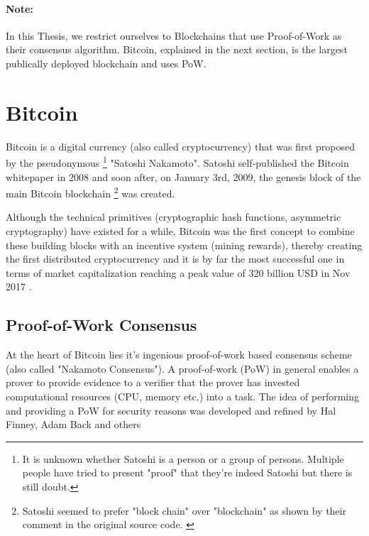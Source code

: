 \paragraph{Note: }
In this Thesis, we restrict ourselves to Blockchains that use Proof-of-Work as their consensus algorithm. 
Bitcoin, explained in the next section, is the largest publically deployed blockchain and uses PoW.

\section{Bitcoin} \label{intro-bitcoin}

Bitcoin is a digital currency (also called cryptocurrency) that was first proposed by the pseudonymous \footnote{It is unknown whether Satoshi is a person or a group of persons. Multiple people have tried to present "proof" that they're indeed Satoshi but there is still doubt.} "Satoshi Nakamoto". 
Satoshi self-published the Bitcoin whitepaper in 2008 \cite{bitcoinOriginal} and soon after, on January 3rd, 2009, the genesis block of the main Bitcoin blockchain \footnote{Satoshi seemed to prefer "block chain" over "blockchain" as shown by their comment in the original source code. \cite{satoshiComment}} was created.

Although the technical primitives (cryptographic hash functions, asymmetric cryptography) have existed for a while, 
Bitcoin was the first concept to combine these building blocks with an incentive system (mining rewards), thereby creating the first distributed cryptocurrency and it is by far the most successful one in terms of market capitalization reaching a peak value of 320 billion USD in Nov 2017 \cite{btcMarketCap}. 



\subsection{Proof-of-Work Consensus} \label{btc-pow}

At the heart of Bitcoin lies it's ingenious proof-of-work based consensus scheme (also called "Nakamoto Consensus").
A proof-of-work (PoW) in general enables a prover to provide evidence to a verifier that the prover has invested computational resources (CPU, memory etc.) into a task.
The idea of performing and providing a PoW for security reasons was developed and refined by Hal Finney, Adam Back and others \cite{hashcash, finneyRPoW}

